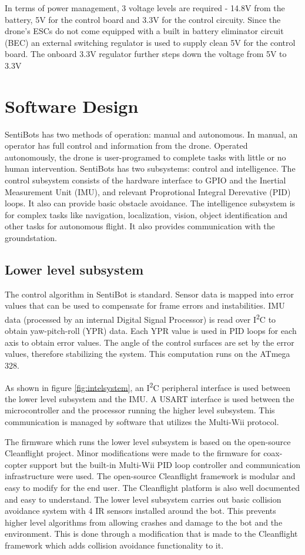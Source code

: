 \documentclass[12pt]{article}
\begin{document}
In terms of power management, 3 voltage levels are required - 14.8V from the battery, 5V for the control board and 3.3V for the control circuity. Since the drone’s ESCs do not come equipped with a built in battery eliminator circuit (BEC) an external switching regulator is used to supply clean 5V for the control board. The onboard 3.3V regulator further steps down the voltage from 5V to 3.3V

\section{Software Design}

SentiBots has two methods of operation: manual and autonomous. In manual, an operator has full control and information from the drone. Operated autonomously, the drone is user-programed to complete tasks with little or no human intervention. SentiBots has two subsystems: control and intelligence. The control subsystem consists of the hardware interface to GPIO and the Inertial Measurement Unit (IMU), and relevant Proprotional Integral Derevative (PID) loops. It also can provide basic obstacle avoidance. The intelligence subsystem is for complex tasks like navigation, localization, vision, object identification and other tasks for autonomous flight. It also provides communication with the groundstation.

\subsection{Lower level subsystem}

The control algorithm in SentiBot is standard. Sensor data is mapped into error values that can be used to compensate for frame errors and instabilities. IMU data (processed by an internal Digital Signal Processor) is read over I\textsuperscript{2}C to obtain yaw-pitch-roll (YPR) data. Each YPR value is used in PID loops for each axis to obtain error values. The angle of the control surfaces are set by the error values, therefore stabilizing the system. This computation runs on the ATmega 328.

As shown in figure \ref{fig:intelsystem}, an I\textsuperscript{2}C peripheral interface is used between the lower level subsystem and the IMU. A USART interface is used between the microcontroller and the processor running the higher level subsystem. This communication is managed by software that utilizes the Multi-Wii protocol\cite{SFV}.

The firmware which runs the lower level subsystem is based on the open-source Cleanflight project. Minor modifications were made to the firmware for coax-copter support but the built-in Multi-Wii PID loop controller and communication infrastructure were used. The open-source Cleanflight framework is modular and easy to modify for the end user. The Cleanflight platform is also well documented and easy to understand. The lower level subsystem carries out basic collision avoidance system with 4 IR sensors installed around the bot. This prevents higher level algorithms from allowing crashes and damage to the bot and the environment. This is done through a modification that is made to the Cleanflight framework which adds collision avoidance functionality to it.
\end{document}
